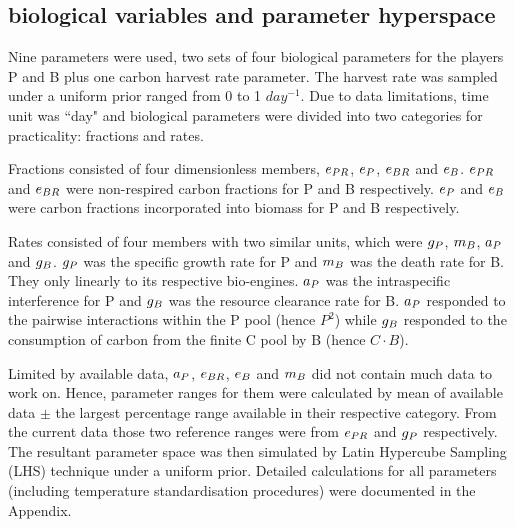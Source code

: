 \documentclass[../thesis.tex]{subfiles} %
\begin{document}
\subsection{biological variables and parameter hyperspace}
Nine parameters were used, two sets of four biological parameters for the players P and B plus one carbon harvest rate parameter.  The harvest rate was sampled under a uniform prior ranged from 0 to 1 $day^{-1}$.  Due to data limitations, time unit was ``day" and biological parameters were divided into two categories for practicality: fractions and rates.

Fractions consisted of four dimensionless members, $e_{PR}$, $e_P$, $e_{BR}$ and $e_B$.  $e_{PR}$ and $e_{BR}$ were non-respired carbon fractions for P and B respectively.  $e_P$ and $e_B$ were carbon fractions incorporated into biomass for P and B respectively.

Rates consisted of four members with two similar units, which were $g_P$, $m_B$, $a_P$ and $g_B$.  $g_P$ was the specific growth rate for P and $m_B$ was the death rate for B.  They only linearly to its respective bio-engines.  $a_P$ was the intraspecific interference for P and $g_B$ was the resource clearance rate for B.  $a_P$ responded to the pairwise interactions within the P pool (hence $P^2$) while $g_B$ responded to the consumption of carbon from the finite C pool by B (hence $C\cdot B$).

Limited by available data, $a_P$, $e_{BR}$, $e_B$ and $m_B$ did not contain much data to work on.  Hence, parameter ranges for them were calculated by mean of available data $\pm$ the largest percentage range available in their respective category.  From the current data those two reference ranges were from $e_{PR}$ and $g_P$ respectively.  The resultant parameter space was then simulated by Latin Hypercube Sampling (LHS) technique under a uniform prior.  Detailed calculations for all parameters (including temperature standardisation procedures) were documented in the Appendix.
\end{document}
